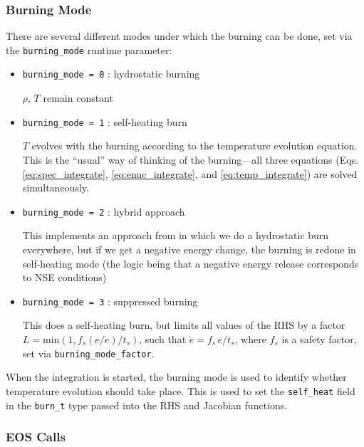 \subsubsection{Burning Mode}

There are several different modes under which the burning can be done, set
via the {\tt burning\_mode} runtime parameter:
\begin{itemize}
\item {\tt burning\_mode = 0} : hydrostatic burning

  $\rho$, $T$ remain constant

\item {\tt burning\_mode = 1} : self-heating burn

  $T$ evolves with the burning according to the temperature evolution
  equation.  This is the ``usual'' way of thinking of the
  burning---all three equations (Eqs. \ref{eq:spec_integrate},
  \ref{eq:enuc_integrate}, and \ref{eq:temp_integrate}) are solved
  simultaneously.

\item {\tt burning\_mode = 2} : hybrid approach

  This implements an approach from \cite{raskin:2010} in which we do a
  hydrostatic burn everywhere, but if we get a negative energy change,
  the burning is redone in self-heating mode (the logic being that a
  negative energy release corresponds to NSE conditions)

\item {\tt burning\_mode = 3} : suppressed burning

  This does a self-heating burn, but limits all values of the RHS
  by a factor $L = \text{min}(1, f_s (e / \dot{e}) / t_s)$, such
  that $\dot{e} = f_s\, e / t_s$, where $f_s$ is a safety factor,
  set via {\tt burning\_mode\_factor}.


\end{itemize}

When the integration is started, the burning mode is used to identify
whether temperature evolution should take place.  This is used to
set the {\tt self\_heat} field in the {\tt burn\_t} type passed
into the RHS and Jacobian functions.



\subsubsection{EOS Calls}

